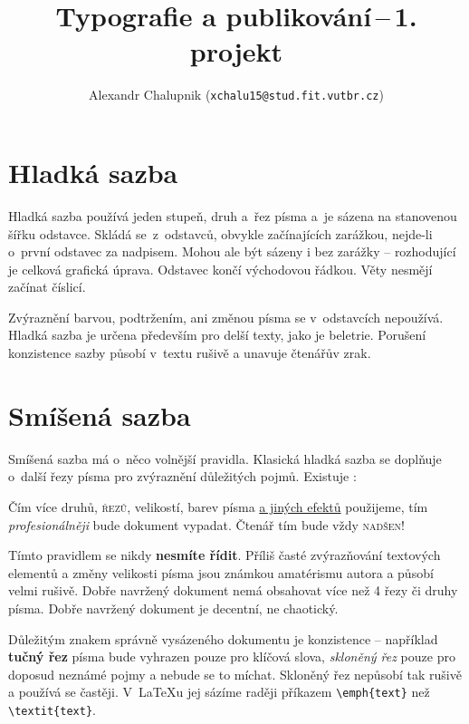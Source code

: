 \documentclass[10pt, a4paper,twocolumn]{article}
\title{Typografie a publikování\,--\,1. projekt}
\author{Alexandr Chalupnik (\texttt{xchalu15@stud.fit.vutbr.cz})}
\date{}
\begin{document}
\maketitle
    
\section{Hladká sazba}

Hladká sazba používá jeden stupeň, druh a~řez písma a~je sázena na stanovenou šířku odstavce. Skládá se~z~odstavců, obvykle začínajících zarážkou, nejde-li o~první odstavec za nadpisem. Mohou ale být sázeny i bez zarážky -- rozhodující je celková grafická úprava. Odstavec končí východovou řádkou. Věty nesmějí začínat číslicí.\par
Zvýraznění barvou, podtržením, ani změnou písma se v~odstavcích nepoužívá. Hladká sazba je určena především pro delší texty, jako je beletrie. Porušení konzistence sazby působí v~textu rušivě a unavuje čtenářův zrak.

\section{Smíšená sazba}

Smíšená sazba má o~něco volnější pravidla. Klasická hladká sazba se doplňuje o~další řezy písma pro zvýraznění důležitých pojmů. Existuje :
\bigskip
\begin{adjustwidth}{0.77cm}{0.80cm}
\qquad
{ \selectfont Čím více druhů,} \textsc{řezů,} {\tiny velikostí}, 
barev písma \underline{a jiných efektů} použijeme, tím \emph{\large profesionálněji}  bude dokument vypadat. Čtenář tím bude vždy \textsc{nadšen}!
\end{adjustwidth}
\bigskip
{\footnotesize Tímto} pravidlem se nikdy \textbf{nesmíte řídit}. Příliš časté zvýrazňování textových elementů a změny velikosti {\fontsize{20}{24} \selectfont písma} jsou známkou amatérismu autora a působí {\fontsize{30}{36} \selectfont velmi} rušivě. Dobře navržený dokument nemá obsahovat více než
4 řezy či druhy písma. Dobře navržený dokument je decentní, ne chaotický.

Důležitým znakem správně vysázeného dokumentu je konzistence -- například \textbf{tučný řez} písma bude vyhrazen pouze pro klíčová slova, \emph{skloněný řez} pouze pro doposud neznámé pojmy a nebude se to míchat. Skloněný řez nepůsobí tak rušivě a používá se častěji. V~\LaTeX u jej sázíme raději příkazem \verb|\emph{text}| než \verb|\textit{text}|.
\end{document}
